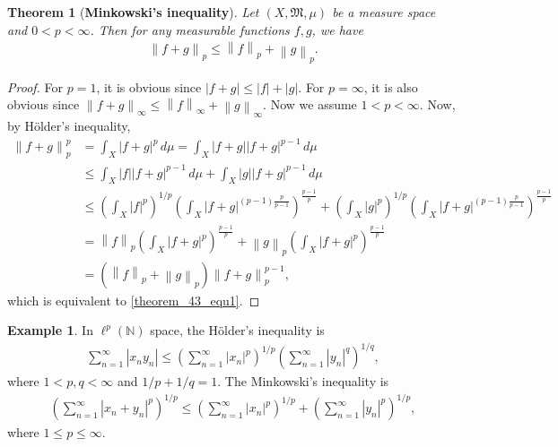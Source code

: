 \documentclass[11pt]{book}
\newtheorem{theorem}{Theorem}[chapter]
\theoremstyle{definition}
\newtheorem{example}{Example}[chapter]
\numberwithin{equation}{chapter}
\begin{document}
\begin{theorem}[{\bf Minkowski's inequality}]\label{theorem_43}
Let $(X,\mathfrak{M},\mu)$ be a measure space and $0 < p < \infty$. Then for any measurable functions $f,g$, we have
\begin{align}\label{theorem_43_equ1}
    \left\|f+g\right\|_p \leq \left\|f\right\|_p + \left\|g\right\|_p.
\end{align}
\end{theorem}
\begin{proof}
For $p = 1$, it is obvious since $\left|f+g\right| \leq \left|f\right| + \left|g\right|$. For $p = \infty$, it is also obvious since $\left\|f+g\right\|_{\infty} \leq \left\|f\right\|_{\infty} + \left\|g\right\|_{\infty}$. Now we assume $1 < p < \infty$. Now, by Hölder's inequality,
\begin{align*}
    \left\|f+g\right\|_p^p & = \int_X \left|f+g\right|^p\,d\mu = \int_X \left|f+g\right| \left|f+g\right|^{p-1}\,d\mu \\
    & \leq \int_X \left|f\right| \left|f+g\right|^{p-1}\,d\mu + \int_X \left|g\right| \left|f+g\right|^{p-1}\,d\mu \\
    & \leq \left(\int_X \left|f\right|^p\right)^{1/p} \left(\int_X \left|f+g\right|^{(p-1)\frac{p}{p-1}}\right)^{\frac{p-1}{p}} + \left(\int_X \left|g\right|^p\right)^{1/p} \left(\int_X \left|f+g\right|^{(p-1)\frac{p}{p-1}}\right)^{\frac{p-1}{p}} \\
    & = \left\|f\right\|_p \left(\int_X \left|f+g\right|^{p}\right)^{\frac{p-1}{p}} + \left\|g\right\|_p \left(\int_X \left|f+g\right|^{p}\right)^{\frac{p-1}{p}} \\
    & = \left(\left\|f\right\|_p + \left\|g\right\|_p\right) \left\|f+g\right\|_p^{p-1},
\end{align*}
which is equivalent to \eqref{theorem_43_equ1}.
\end{proof}

\medskip

\begin{example}
In $\ell^p(\mathbb{N})$ space, the Hölder's inequality is 
\begin{align*}
    \sum^\infty_{n=1} \left|x_ny_n\right| \leq \left(\sum^\infty_{n=1} \left|x_n\right|^p \right)^{1/p} \left(\sum^\infty_{n=1} \left|y_n\right|^q \right)^{1/q},
\end{align*}
where $1 < p,q < \infty$ and $1/p + 1/q = 1$. The Minkowski's inequality is 
\begin{align*}
    \left(\sum^\infty_{n=1} \left|x_n + y_n\right|^p \right)^{1/p} \leq \left(\sum^\infty_{n=1} \left|x_n\right|^p \right)^{1/p} + \left(\sum^\infty_{n=1} \left|y_n\right|^p \right)^{1/p},
\end{align*}
where $1 \leq p \leq \infty$.
\end{example}
\end{document}
